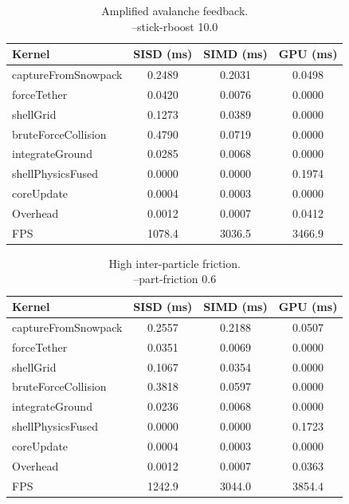 \begin{table}[H]
  \caption{\centering Amplified avalanche feedback. \\ \centering --stick-rboost 10.0}
  \label{tab:jetson_scenario3_timing}
  \centering
  \scriptsize
  \begin{tabular}{@{}lccc@{}}
    \toprule
    \textbf{Kernel} & \textbf{SISD (ms)} & \textbf{SIMD (ms)} & \textbf{GPU (ms)} \\
    \midrule
    captureFromSnowpack           & 0.2489 & 0.2031 & 0.0498 \\
    forceTether                   & 0.0420 & 0.0076 & 0.0000 \\
    shellGrid                     & 0.1273 & 0.0389 & 0.0000 \\
    bruteForceCollision           & 0.4790 & 0.0719 & 0.0000 \\
    integrateGround               & 0.0285 & 0.0068 & 0.0000 \\
    shellPhysicsFused             & 0.0000 & 0.0000 & 0.1974 \\
    coreUpdate                    & 0.0004 & 0.0003 & 0.0000 \\
    Overhead                      & 0.0012 & 0.0007 & 0.0412 \\
    \bottomrule
    FPS                           & 1078.4 & 3036.5 & 3466.9
  \end{tabular}
\end{table}

\begin{table}[H]
  \caption{High inter-particle friction. \\ --part-friction 0.6}
  \label{tab:jetson_scenario4_timing}
  \centering
  \scriptsize
  \begin{tabular}{@{}lccc@{}}
    \toprule
    \textbf{Kernel} & \textbf{SISD (ms)} & \textbf{SIMD (ms)} & \textbf{GPU (ms)} \\
    \midrule
    captureFromSnowpack           & 0.2557 & 0.2188 & 0.0507 \\
    forceTether                   & 0.0351 & 0.0069 & 0.0000 \\
    shellGrid                     & 0.1067 & 0.0354 & 0.0000 \\
    bruteForceCollision           & 0.3818 & 0.0597 & 0.0000 \\
    integrateGround               & 0.0236 & 0.0068 & 0.0000 \\
    shellPhysicsFused             & 0.0000 & 0.0000 & 0.1723 \\
    coreUpdate                    & 0.0004 & 0.0003 & 0.0000 \\
    Overhead                      & 0.0012 & 0.0007 & 0.0363 \\
    \bottomrule
    FPS                           & 1242.9 & 3044.0 & 3854.4
  \end{tabular}
\end{table}

